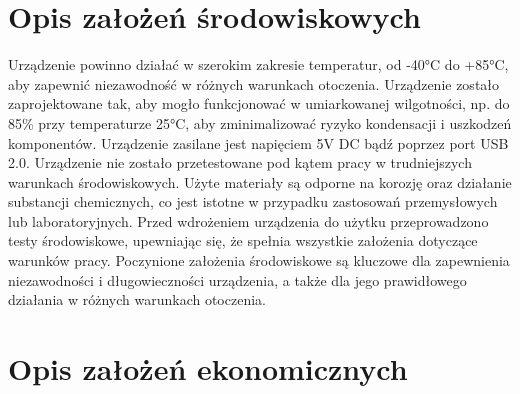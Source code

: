     \section{Opis założeń środowiskowych}
    
Urządzenie powinno działać w szerokim zakresie temperatur, od -40°C do +85°C, aby zapewnić niezawodność w różnych warunkach otoczenia. Urządzenie zostało zaprojektowane tak, aby mogło funkcjonować w umiarkowanej wilgotności, np. do 85\% przy temperaturze 25°C, aby zminimalizować ryzyko kondensacji i uszkodzeń komponentów. Urządzenie zasilane jest napięciem 5V DC bądź poprzez port USB 2.0. Urządzenie nie zostało przetestowane pod kątem pracy w trudniejszych warunkach środowiskowych. Użyte materiały są odporne na korozję oraz działanie substancji chemicznych, co jest istotne w przypadku zastosowań przemysłowych lub laboratoryjnych. Przed wdrożeniem urządzenia do użytku przeprowadzono testy środowiskowe, upewniając się, że spełnia wszystkie założenia dotyczące warunków pracy.
Poczynione założenia środowiskowe są kluczowe dla zapewnienia niezawodności i długowieczności urządzenia, a także dla jego prawidłowego działania w różnych warunkach otoczenia.


    \section{Opis założeń ekonomicznych}